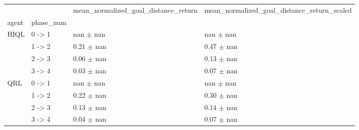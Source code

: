 \begin{tabular}{llll}
\toprule
 &  & mean_normalized_goal_distance_return & mean_normalized_goal_distance_return_scaled \\
agent & phase_num &  &  \\
\midrule
\multirow[t]{4}{*}{HIQL} & 0 -> 1 & nan $\pm$ nan & nan $\pm$ nan \\
 & 1 -> 2 & 0.21 $\pm$ nan & 0.47 $\pm$ nan \\
 & 2 -> 3 & 0.06 $\pm$ nan & 0.13 $\pm$ nan \\
 & 3 -> 4 & 0.03 $\pm$ nan & 0.07 $\pm$ nan \\
\cline{1-4}
\multirow[t]{4}{*}{QRL} & 0 -> 1 & nan $\pm$ nan & nan $\pm$ nan \\
 & 1 -> 2 & 0.22 $\pm$ nan & 0.30 $\pm$ nan \\
 & 2 -> 3 & 0.13 $\pm$ nan & 0.14 $\pm$ nan \\
 & 3 -> 4 & 0.04 $\pm$ nan & 0.07 $\pm$ nan \\
\cline{1-4}
\bottomrule
\end{tabular}
